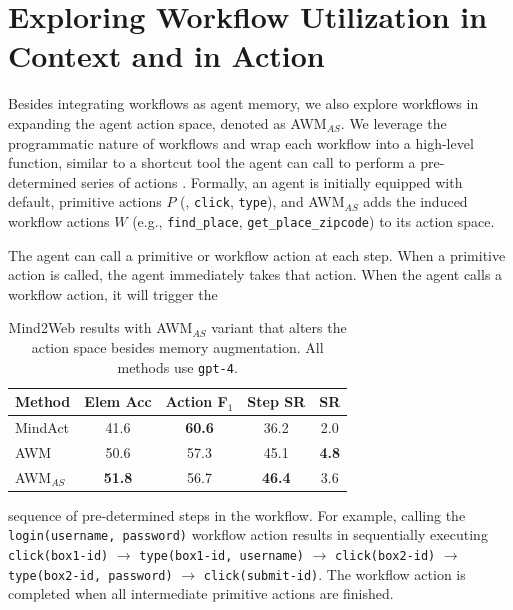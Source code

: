 \section{Exploring Workflow Utilization in Context and in Action}
\label{sec:expand-action}
Besides integrating workflows as agent memory, we also explore workflows in expanding the agent action space, denoted as \textsc{AWM}$_{AS}$.
We leverage the programmatic nature of workflows and wrap each workflow into a high-level function, similar to a shortcut tool the agent can call to perform a pre-determined series of actions \citep{wang2024what}.
Formally, an agent is initially equipped with default, primitive actions $P$ (\eg, \texttt{click}, \texttt{type}), and \textsc{AWM}$_{AS}$ adds the induced workflow actions $W$ (e.g., \texttt{find\_place}, \texttt{get\_place\_zipcode}) to its action space. 

The agent can call a primitive or workflow action at each step. When a primitive action is called, the agent immediately takes that action. 
When the agent calls a workflow action, it will trigger the
%
\begin{table}
\small
\vspace{-4mm}
\caption{Mind2Web results with \textsc{AWM}$_{AS}$ variant that alters the action space besides memory augmentation. All methods use \texttt{gpt-4}.}
\label{tab:action-space}
\begin{tabular}{l|cccc}
\toprule
{\bf Method} & {\bf Elem Acc} & {\bf Action F$_{1}$} & {\bf Step SR} & {\bf SR} \\
\midrule
{MindAct} & {41.6} & {\bf 60.6} & {36.2} & {2.0} \\
\textsc{AWM} & {50.6} & {57.3} & {45.1} & {\bf 4.8} \\
\textsc{AWM}$_{AS}$ & {\bf 51.8} & {56.7} & {\bf 46.4} & {3.6} \\
\bottomrule
\end{tabular}
\vspace{-1mm}
\end{table}
%
sequence of pre-determined steps in the workflow. For example, calling the \texttt{login(username, password)} workflow action results in sequentially executing \texttt{click(box1-id)} $\rightarrow$ \texttt{type(box1-id, username)} $\rightarrow$ \texttt{click(box2-id)} $\rightarrow$ \texttt{type(box2-id, password)} $\rightarrow$ \texttt{click(submit-id)}.
The workflow action is completed when all intermediate primitive actions are finished.

